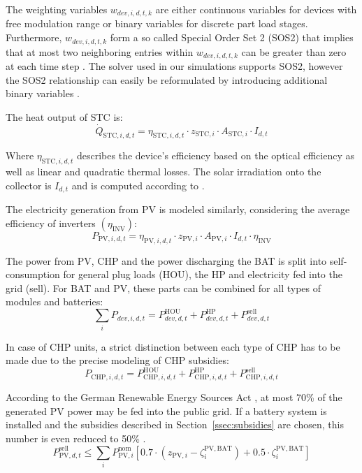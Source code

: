 The weighting variables $w_{dev,i,d,t,k}$ are either continuous variables for devices with free modulation range or binary variables for discrete part load stages.
Furthermore, $w_{dev,i,d,t,k}$ form a so called Special Order Set 2 (SOS2) that implies that at most two neighboring entries within $w_{dev,i,d,t,k}$ can be greater than zero at each time step \cite{Williams2013}.
The solver used in our simulations supports SOS2, however the SOS2 relationship can easily be reformulated by introducing additional binary variables \cite{Williams2013}.

The heat output of STC is:
\begin{equation}
	\dot{Q}_{\mathrm{STC,}i,d,t} = \eta_{\mathrm{STC,}i,d,t} \cdot z_{\mathrm{STC,}i} \cdot A_{\mathrm{STC,}i} \cdot I_{d,t}
\end{equation}

Where $\eta_{\mathrm{STC,}i,d,t}$ describes the device's efficiency based on the optical efficiency as well as linear and quadratic thermal losses.
The solar irradiation onto the collector is $I_{d,t}$ and is computed according to \cite{Duffie2013,Perez1990}.

The electricity generation from PV is modeled similarly, considering the average efficiency of inverters $\left(\eta_{\mathrm{INV}}\right)$:
\begin{equation}
	P_{\mathrm{PV,}i,d,t} = \eta_{\mathrm{PV,}i,d,t} \cdot z_{\mathrm{PV,}i} \cdot A_{\mathrm{PV,}i} \cdot I_{d,t} \cdot \eta_{\mathrm{INV}}
\end{equation}

The power from PV, CHP and the power discharging the BAT is split into self-consumption for general plug loads (HOU), the HP and electricity fed into the grid (sell).
For BAT and PV, these parts can be combined for all types of modules and batteries:
\begin{equation}
	\sum\limits_{i} P_{dev,i,d,t} = P^\mathrm{HOU}_{dev,d,t} + P^\mathrm{HP}_{dev,d,t} + P^\mathrm{sell}_{dev,d,t}
\end{equation}

In case of CHP units, a strict distinction between each type of CHP has to be made due to the precise modeling of CHP subsidies:
\begin{equation}
P_{\mathrm{CHP,}i,d,t} = P^\mathrm{HOU}_{\mathrm{CHP,}i,d,t} + P^\mathrm{HP}_{\mathrm{CHP,}i,d,t} + P^\mathrm{sell}_{\mathrm{CHP,}i,d,t}
\end{equation}

According to the German Renewable Energy Sources Act \cite{EEG2014}, at most 70\% of the generated PV power may be fed into the public grid.
If a battery system is installed and the subsidies described in Section~\ref{ssec:subsidies} are chosen, this number is even reduced to 50\% \cite{KfW275_2016}.
\begin{equation}
	P^\mathrm{sell}_{\mathrm{PV,}d,t} \le \sum\limits_{i} P^\mathrm{nom}_{\mathrm{PV,}i} \left[ 0.7 \cdot \left(z_{\mathrm{PV,}i} - \zeta^{\mathrm{PV,BAT}}_i \right) + 0.5 \cdot \zeta^{\mathrm{PV,BAT}}_i \right]
	\label{eqn:limit feed in}
\end{equation}

